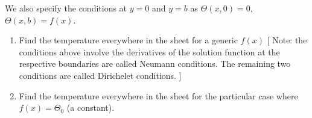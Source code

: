 \documentclass[fleqn]{article}
\begin{document}
\begin{enumerate}
    We also specify the conditions at $y = 0$ and $y = b$ as
    $\Theta(x,0) = 0$, $\Theta(x,b) = f(x)$.
      \begin{enumerate}
      \item Find the temperature everywhere in the sheet for a generic $f(x)$ [ Note: the conditions above involve the derivatives of the solution function at the respective boundaries are called Neumann conditions. The remaining two conditions are called Dirichelet conditions. ]  
      
      \item Find the temperature everywhere in the sheet for the particular case where $f(x)=\Theta_0$ (a constant). 
      
      \end{enumerate}
    
  \end{enumerate}
\end{document}
